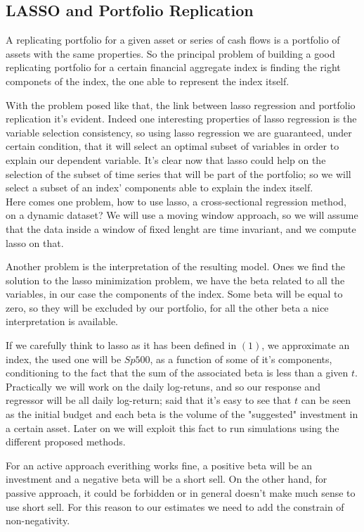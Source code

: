 \documentclass{article}%
\begin{document}
\subsection{LASSO and Portfolio Replication}

A replicating portfolio for a given asset or series of cash flows is a portfolio of assets with the same properties. So the principal problem of building a good replicating portfolio for a certain financial aggregate index is finding the right componets of the index, the one able to represent the index itself. 

With the problem posed like that, the link between lasso regression and portfolio replication it's evident. Indeed one interesting properties of lasso regression is the variable selection consistency, so using lasso regression we are guaranteed, under certain condition, that it will select an optimal subset of variables in order to explain our dependent variable. It's clear now that lasso could help on the selection of the subset of time series that will be part of the portfolio; so we will select a subset of an index' components  able to explain the index itself.
\\

Here comes one problem, how to use lasso, a cross-sectional regression method, on a dynamic dataset? We will use a moving window approach, so we will assume that the data inside a window of fixed lenght are time invariant, and we compute lasso on that.

Another problem is the interpretation of the resulting model. Ones we find the solution to the lasso minimization problem, we have the beta related to all the variables, in our case the components of the index. Some beta will be equal to zero, so they will be excluded by our portfolio, for all the other beta a nice interpretation is available. 

If we carefully think to lasso as it has been defined in $(1)$, we approximate an index, the used one will be $Sp500$, as a function of some of it's components, conditioning to the fact that the sum of the associated beta is less than a given $t$. Practically we will work on the daily log-retuns, and so our response and regressor will be all daily log-return; said that it's easy to see that $t$ can be seen as the initial budget and each beta is the volume of the "suggested" investment in a certain asset. Later on we will exploit this fact to run simulations using the different proposed methods.

For an active approach everithing works fine, a positive beta will be an investment and a negative beta will be a short sell. On the other hand, for passive approach, it could be forbidden or in general doesn't make much sense to use short sell. For this reason to our estimates we need to add the constrain of non-negativity.
\\
\end{document}
